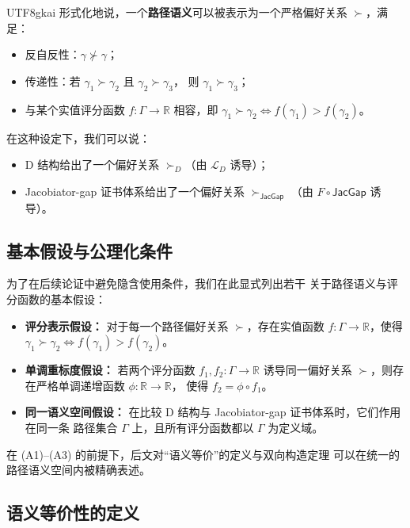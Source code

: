 \documentclass[12pt]{article}
\newcommand{\JacGap}{\mathsf{JacGap}}
\begin{document}
\begin{CJK*}{UTF8}{gkai}
形式化地说，一个\textbf{路径语义}可以被表示为一个严格偏好关系
$\succ$，满足：
\begin{itemize}
  \item 反自反性：$\gamma\not\succ\gamma$；
  \item 传递性：若 $\gamma_1\succ\gamma_2$ 且 $\gamma_2\succ\gamma_3$，
        则 $\gamma_1\succ\gamma_3$；
  \item 与某个实值评分函数 $f:\Gamma\to\mathbb{R}$ 相容，即
        $\gamma_1\succ\gamma_2 \Leftrightarrow f(\gamma_1)>f(\gamma_2)$。
\end{itemize}

在这种设定下，我们可以说：
\begin{itemize}
  \item D 结构给出了一个偏好关系 $\succ_D$（由 $\mathcal{L}_D$ 诱导）；
  \item Jacobiator-gap 证书体系给出了一个偏好关系 $\succ_{\JacGap}$
        （由 $F\circ\JacGap$ 诱导）。
\end{itemize}

\subsection{基本假设与公理化条件}

为了在后续论证中避免隐含使用条件，我们在此显式列出若干
关于路径语义与评分函数的基本假设：
\begin{itemize}
  \item[(A1)] \textbf{评分表示假设：}
    对于每一个路径偏好关系 $\succ$，存在实值函数
    $f:\Gamma\to\mathbb{R}$，使得
    $\gamma_1\succ\gamma_2 \Leftrightarrow f(\gamma_1)>f(\gamma_2)$。
  \item[(A2)] \textbf{单调重标度假设：}
    若两个评分函数 $f_1,f_2:\Gamma\to\mathbb{R}$ 诱导同一偏好关系
    $\succ$，则存在严格单调递增函数 $\phi:\mathbb{R}\to\mathbb{R}$，
    使得 $f_2=\phi\circ f_1$。
  \item[(A3)] \textbf{同一语义空间假设：}
    在比较 D 结构与 Jacobiator-gap 证书体系时，它们作用在同一条
    路径集合 $\Gamma$ 上，且所有评分函数都以 $\Gamma$ 为定义域。
\end{itemize}

在 (A1)–(A3) 的前提下，后文对“语义等价”的定义与双向构造定理
可以在统一的路径语义空间内被精确表述。

\subsection{语义等价性的定义}


\end{CJK*}
\end{document}
